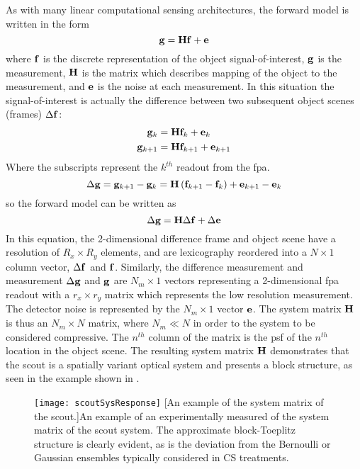 As with many linear computational sensing architectures, the forward model is written in the form
%
\begin{equation}
	\mathbf{g} = \mathbf{H} \mathbf{f} + \mathbf{e}
\end{equation}
%
where $\mathbf{f}$ is the discrete representation of the object signal-of-interest, $\mathbf{g}$ is the measurement, $\mathbf{H}$ is the matrix which describes mapping of the object to the measurement, and $\mathbf{e}$ is the noise at each measurement. In this situation the signal-of-interest is actually the difference between two subsequent object scenes (frames) $\Delta \mathbf{f}$:
%
%
\begin{equation} 
\begin{split}
	\mathbf{g}_{k} &= \mathbf{H} \mathbf{f}_{k} + \mathbf{e}_{k} \\
	\mathbf{g}_{k+1} &= \mathbf{H} \mathbf{f}_{k+1} + \mathbf{e}_{k+1}
\end{split}
\end{equation}
%
Where the subscripts represent the $k^{th}$ readout from the \gls{fpa}.
%
\begin{equation}
	\Delta \mathbf{g} = \mathbf{g}_{k+1} - \mathbf{g}_{k} = \mathbf{H} \left(  \mathbf{f}_{k+1} - \mathbf{f}_{k}  \right) + \mathbf{e}_{k+1} - \mathbf{e}_{k} 
\end{equation}
%
%
so the forward model can be written as
%
\begin{equation}
	\Delta \mathbf{g} = \mathbf{H} \Delta \mathbf{f}  + \Delta \mathbf{e}
	\label{eq:scoutgHf}
\end{equation}
%
In this equation, the 2-dimensional difference frame and object scene have a resolution of $ R_x \times R_y$ elements, and are lexicography reordered into a $N \times 1$ column vector, $\Delta \mathbf{f}$ and $\mathbf{f}$. Similarly, the difference measurement and measurement $\Delta \mathbf{g}$ and $\mathbf{g}$ are $N_m \times 1$ vectors representing a 2-dimensional \gls{fpa} readout with a $ r_x \times r_y$ matrix which represents the low resolution measurement. The detector noise is represented by the $ N_m \times 1 $ vector $\mathbf{e}$. The system matrix $\mathbf{H}$ is thus an $N_m \times N $ matrix, where $N_m \ll N$ in order to the system to be considered compressive. The $n^{th}$ column of the matrix is the \gls{psf} of the $n^{th}$ location in the object scene. The resulting system matrix $\mathbf{H}$ demonstrates that the \gls{scout} is a spatially variant optical system and presents a block structure, as seen in the example shown in .

\begin{sidewaysfigure}
	\texttt{[image: scoutSysResponse]}
	[An example of the system matrix of the \gls{scout}.]{An example of an experimentally measured of the system matrix of the \gls{scout} system. The approximate block-Toeplitz structure is clearly evident, as is the deviation from the Bernoulli or Gaussian ensembles typically considered in CS treatments. }
	\label{fig:scoutSysResponse}
\end{sidewaysfigure}


